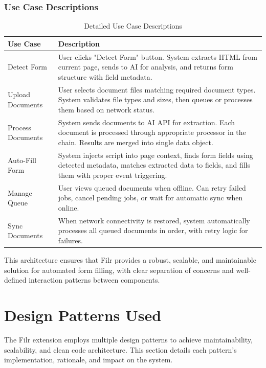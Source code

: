 \documentclass[11pt, a4paper]{article}
\theoremstyle{plain}
\theoremstyle{definition}
\begin{document}
\subsubsection{Use Case Descriptions}

\begin{table}[H]
\centering
\caption{Detailed Use Case Descriptions}
\label{tab:use-case-descriptions}
\begin{tabularx}{\textwidth}{lX}
\toprule
\textbf{Use Case} & \textbf{Description} \\
\midrule
Detect Form & User clicks "Detect Form" button. System extracts HTML from current page, sends to AI for analysis, and returns form structure with field metadata. \\
\hline
Upload Documents & User selects document files matching required document types. System validates file types and sizes, then queues or processes them based on network status. \\
\hline
Process Documents & System sends documents to AI API for extraction. Each document is processed through appropriate processor in the chain. Results are merged into single data object. \\
\hline
Auto-Fill Form & System injects script into page context, finds form fields using detected metadata, matches extracted data to fields, and fills them with proper event triggering. \\
\hline
Manage Queue & User views queued documents when offline. Can retry failed jobs, cancel pending jobs, or wait for automatic sync when online. \\
\hline
Sync Documents & When network connectivity is restored, system automatically processes all queued documents in order, with retry logic for failures. \\
\bottomrule
\end{tabularx}
\end{table}

This architecture ensures that Filr provides a robust, scalable, and maintainable solution for automated form filling, with clear separation of concerns and well-defined interaction patterns between components.

\newpage

\section{Design Patterns Used}

The Filr extension employs multiple design patterns to achieve maintainability, scalability, and clean code architecture. This section details each pattern's implementation, rationale, and impact on the system.
\end{document}
